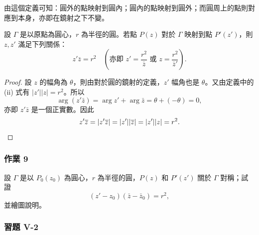 由這個定義可知：圓外的點映射到圓內；圓內的點映射到圓外；而圓周上的點則對應到本身，亦即在鏡射之下不變。

\begin{discussion}[$^*$]
設 $\Gamma$ 是以原點為圓心，$r$ 為半徑的圓。若點 $P(z)$ 對於 $\Gamma$ 映射到點 $P'(z')$，則 $z, z'$ 滿足下列關係：
\[
z'\bar{z} = r^2 \quad \left(\text{亦即 } z' = \frac{r^2}{\bar{z}} \text{ 或 } z = \frac{r^2}{\bar{z}'}\right).
\]
\end{discussion}

\begin{proof}
設 $z$ 的幅角為 $\theta$，則由對於圓的鏡射的定義，$z'$ 幅角也是 $\theta$。又由定義中的 (ii) 式有 $|z'||z| = r^2$。所以
\[
\arg(z'\bar{z}) = \arg z' + \arg\bar{z} = \theta + (-\theta) = 0,
\]
亦即 $z'\bar{z}$ 是一個正實數。因此
\[
z'\bar{z} = |z'\bar{z}| = |z'||\bar{z}| = |z'||z| = r^2. \qedhere
\]
\end{proof}

\subsubsection*{作業 9}
設 $\Gamma$ 是以 $P_0(z_0)$ 為圓心，$r$ 為半徑的圓，$P(z)$ 和 $P'(z')$ 關於 $\Gamma$ 對稱；試證
\[
(z'-z_0)(\bar{z}-\bar{z}_0) = r^2,
\]
並繪圖說明。


\subsubsection*{習題 V-2}

